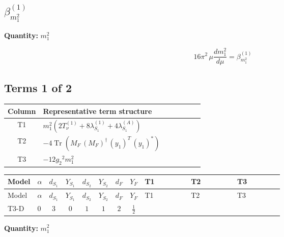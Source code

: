 \documentclass[8pt]{article}
\begin{document}
\begin{landscape}
\section*{$\beta_{m_1^2}^{(1)}$}
\noindent\textbf{Quantity: }$m_1^2$\par\smallskip
\[16\pi^2\,\mu\frac{d m_1^2}{d\mu}=\beta_{m_1^2}^{(1)}\]
\subsection*{Terms 1 of 2}
\begin{center}
\begin{tabular}{@{}c >{\raggedright\arraybackslash}p{0.82\linewidth}@{}}
\toprule
Column & Representative term structure \\
\midrule
T1 & \(\displaystyle {m_1^2} (2 T_{\nu}^{(1)}+8 {\lambda_{S_1}^{(1)}}+4 {\lambda_{S_1}^{(A)}})\) \\
\midrule
T2 & \(\displaystyle -4 \operatorname{Tr}\!\left({M_F}\,\left({M_F}\right)^{\dagger}\,\left({y_1}\right)^{T}\,\left({y_1}\right)^{*}\right)\) \\
\midrule
T3 & \(\displaystyle -12 {g_2}^2 {m_1^2}\) \\
\midrule
\bottomrule
\end{tabular}
\end{center}
\smallskip
\tiny
\begin{longtable}{@{}llcccccc >{\raggedright\arraybackslash}p{0.21\linewidth} >{\raggedright\arraybackslash}p{0.21\linewidth} >{\raggedright\arraybackslash}p{0.21\linewidth}@{}}
\toprule
Model & $\alpha$ & $d_{S_1}$ & $Y_{S_1}$ & $d_{S_2}$ & $Y_{S_2}$ & $d_F$ & $Y_F$ & T1 & T2 & T3 \\
\midrule
\endfirsthead
\toprule
Model & $\alpha$ & $d_{S_1}$ & $Y_{S_1}$ & $d_{S_2}$ & $Y_{S_2}$ & $d_F$ & $Y_F$ & T1 & T2 & T3 \\
\midrule
\endhead
T3-D & $0$ & $3$ & $0$ & $1$ & $1$ & $2$ & $\frac{1}{2}$ & \scriptsize\adjustbox{max width=\linewidth}{$\begin{gathered} {m_1^2} (2 T_{\nu}^{(1)}+8 {\lambda_{S_1}^{(1)}}+4 {\lambda_{S_1}^{(A)}})\end{gathered}$} & \scriptsize\adjustbox{max width=\linewidth}{$\begin{gathered} -4 \operatorname{Tr}\!\left({M_F}\,\left({M_F}\right)^{\dagger}\,\left({y_1}\right)^{T}\,\left({y_1}\right)^{*}\right)\end{gathered}$} & \scriptsize\adjustbox{max width=\linewidth}{$\begin{gathered} -12 {g_2}^2 {m_1^2}\end{gathered}$} \\
\midrule
\bottomrule
\end{longtable}
\clearpage
\noindent\textbf{Quantity: }$m_1^2$\par\smallskip

\end{landscape}
\end{document}
